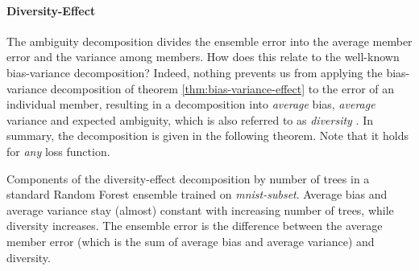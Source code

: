 \documentclass[../main.tex]{subfiles}
\begin{document}
%     






\paragraph{Diversity-Effect} The ambiguity decomposition divides the ensemble error into the average member error and the variance among members. How does this relate to the well-known bias-variance decomposition? Indeed, nothing prevents us from applying the bias-variance decomposition of theorem \ref{thm:bias-variance-effect} to the error of an individual member, resulting in a decomposition into \textit{average} bias, \textit{average} variance and expected ambiguity, which is also referred to as \textit{diversity} \cite{wood_UnifiedTheoryDiversity_2023}.
In summary, the decomposition is given in the following theorem. Note that it holds for \textit{any} loss function. 

\begin{marginfigure}
    \label{fig:spambase-standard-rf-classifier-bvd}
    \caption{
        Components of the diversity-effect decomposition by number of trees in a standard Random Forest ensemble trained on \textit{mnist-subset}. Average bias and average variance stay (almost) constant with increasing number of trees, while diversity increases. The ensemble error is the difference between the average member error (which is the sum of average bias and average variance) and diversity.
    }
\end{marginfigure}
\end{document}
